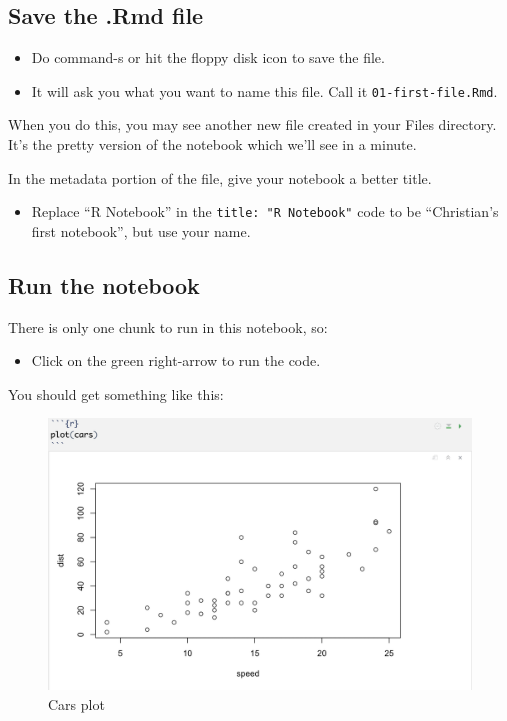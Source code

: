 \documentclass[]{book}
\providecommand{\tightlist}{%
  \setlength{\itemsep}{0pt}\setlength{\parskip}{0pt}}
\begin{document}
\subsection{Save the .Rmd file}\label{save-the-.rmd-file}

\begin{itemize}
\tightlist
\item
  Do command-s or hit the floppy disk icon to save the file.
\item
  It will ask you what you want to name this file. Call it
  \texttt{01-first-file.Rmd}.
\end{itemize}

When you do this, you may see another new file created in your Files
directory. It's the pretty version of the notebook which we'll see in a
minute.

In the metadata portion of the file, give your notebook a better title.

\begin{itemize}
\tightlist
\item
  Replace ``R Notebook'' in the \texttt{title:\ "R\ Notebook"} code to
  be ``Christian's first notebook'', but use your name.
\end{itemize}

\subsection{Run the notebook}\label{run-the-notebook}

There is only one chunk to run in this notebook, so:

\begin{itemize}
\tightlist
\item
  Click on the green right-arrow to run the code.
\end{itemize}

You should get something like this:

\begin{figure}
\centering
\includegraphics[width=6.25000in]{images/02-rstudio-defaultplot.png}
\caption{Cars plot}
\end{figure}
\end{document}
